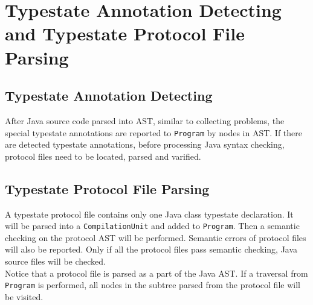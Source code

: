 \documentclass[]{article}
\begin{document}
\section{Typestate Annotation Detecting and Typestate Protocol File Parsing}
\subsection{Typestate Annotation Detecting}
After Java source code parsed into AST, similar to collecting problems, the special typestate annotations are reported to \texttt{Program} by nodes in AST. If there are detected typestate annotations, before processing Java syntax checking, protocol files need to be located, parsed and varified.

\subsection{Typestate Protocol File Parsing}
A typestate protocol file contains only one Java class typestate declaration. It will be parsed into a \texttt{CompilationUnit} and added to \texttt{Program}. Then a semantic checking on the protocol AST will be performed. Semantic errors of protocol files will also be reported. Only if all the protocol files pass semantic checking, Java source files will be checked. \\[0.2cm]
Notice that a protocol file is parsed as a part of the Java AST. If a traversal from \texttt{Program} is performed, all nodes in the subtree parsed from the protocol file will be visited.

\end{document}
